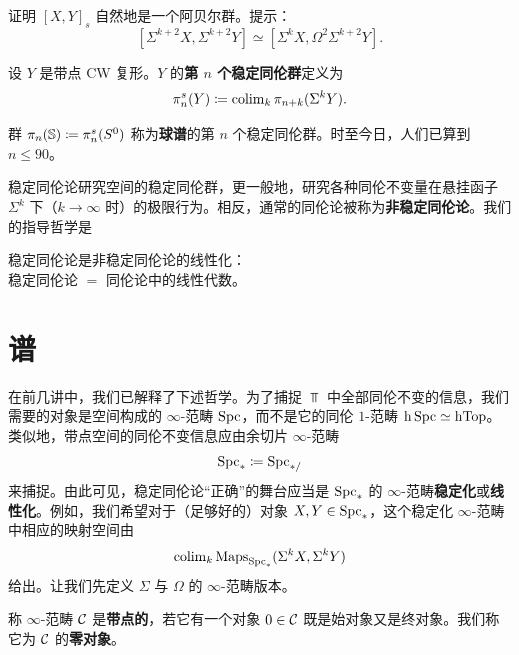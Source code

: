 \begin{exercise}\label{L14-1.6}
证明 $[X,Y]_{s}$ 自然地是一个阿贝尔群。提示：
\[
[\Sigma^{k+2}X,\Sigma^{k+2}Y]\simeq[\Sigma^{k}X,\Omega^{2}\Sigma^{k+2}Y].
\]
\end{exercise}

\begin{definition}\label{L14-1.7}
设 $Y$ 是带点 CW 复形。$Y$ 的\textbf{第 $n$ 个稳定同伦群}定义为
\[
\pi^{s}_{n}(Y)\coloneqq\operatorname{colim}_{k}\pi_{n+k}(\Sigma^{k}Y).
\]
\end{definition}

\begin{example}\label{L14-1.8}
群 $\pi_{n}(\mathbb{S})\coloneqq\pi^{s}_{n}(S^{0})$ 称为\textbf{球谱}的第 $n$ 个稳定同伦群。时至今日，人们已算到 $n\le 90$。
\end{example}

\nitem\label{L14-1.9} 稳定同伦论研究空间的稳定同伦群，更一般地，研究各种同伦不变量在悬挂函子 $\Sigma^{k}$ 下（$k\to\infty$ 时）的极限行为。相反，通常的同伦论被称为\textbf{非稳定同伦论}。我们的指导哲学是

\begin{slogan}\label{L14-1.10}\centering\par
稳定同伦论是非稳定同伦论的线性化：\\[0.4em]
稳定同伦论 $=$ 同伦论中的线性代数。
\end{slogan}

\section{谱}

\nitem\label{L14-2.1} 在前几讲中，我们已解释了下述哲学。为了捕捉 $\Top$ 中全部同伦不变的信息，我们需要的对象是空间构成的 $\infty$-范畴 $\operatorname{Spc}$，而不是它的同伦 $1$-范畴 $\mathrm{h}\operatorname{Spc}\simeq\operatorname{hTop}$。类似地，带点空间的同伦不变信息应由余切片 $\infty$-范畴
\[
\operatorname{Spc}_{\ast}\coloneqq\operatorname{Spc}_{\ast/}
\]
来捕捉。由此可见，稳定同伦论“正确”的舞台应当是 $\operatorname{Spc}_{\ast}$ 的 $\infty$-范畴\textbf{稳定化}或\textbf{线性化}。例如，我们希望对于（足够好的）对象 $X,Y\in\operatorname{Spc}_{\ast}$，这个稳定化 $\infty$-范畴中相应的映射空间由
\[
\operatorname{colim}_{k}\operatorname{Maps}_{\operatorname{Spc}_{\ast}}(\Sigma^{k}X,\Sigma^{k}Y)
\]
给出。让我们先定义 $\Sigma$ 与 $\Omega$ 的 $\infty$-范畴版本。

\begin{definition}\label{L14-2.2}
称 $\infty$-范畴 $\mathcal{C}$ 是\textbf{带点的}，若它有一个对象 $0\in\mathcal{C}$ 既是始对象又是终对象。我们称它为 $\mathcal{C}$ 的\textbf{零对象}。
\end{definition}

